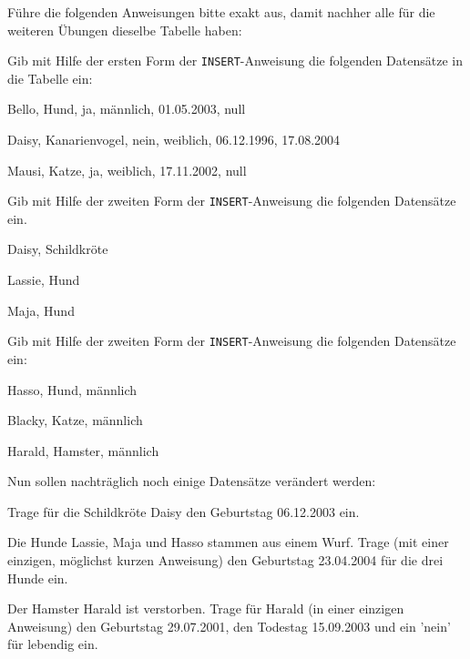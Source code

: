 Führe die folgenden Anweisungen bitte exakt aus, damit nachher alle für die
weiteren Übungen dieselbe Tabelle haben:

\begin{compactenum}[a)]
\item Gib mit Hilfe der ersten Form der \lstinline{INSERT}-Anweisung die
folgenden Datensätze in die Tabelle  ein:

\begin{compactitem}
  \item Bello, Hund, ja, männlich, 01.05.2003, null
  \item Daisy, Kanarienvogel, nein, weiblich, 06.12.1996, 17.08.2004
  \item Mausi, Katze, ja, weiblich, 17.11.2002, null
\end{compactitem}

\item Gib mit Hilfe der zweiten Form der \lstinline{INSERT}-Anweisung die
folgenden Datensätze ein.

\begin{compactitem}
  \item Daisy, Schildkröte
  \item Lassie, Hund
  \item Maja, Hund
\end{compactitem}

\item Gib mit Hilfe der zweiten Form der \lstinline{INSERT}-Anweisung die
folgenden Datensätze ein:

\begin{compactitem}
  \item Hasso, Hund, männlich
  \item Blacky, Katze, männlich
  \item Harald, Hamster, männlich
\end{compactitem}

\item Nun sollen nachträglich noch einige Datensätze verändert werden:

\begin{compactitem}
  \item Trage für die Schildkröte Daisy den Geburtstag 06.12.2003 ein.
  \item Die Hunde Lassie, Maja und Hasso stammen aus einem Wurf. Trage (mit einer 
  einzigen, möglichst kurzen Anweisung) den Geburtstag 23.04.2004 für die drei
  Hunde ein.
  \item Der Hamster Harald ist verstorben. Trage für Harald (in einer einzigen
  Anweisung) den Geburtstag 29.07.2001, den Todestag 15.09.2003 und ein ’nein’
  für lebendig ein.
\end{compactitem}
\end{compactenum}


